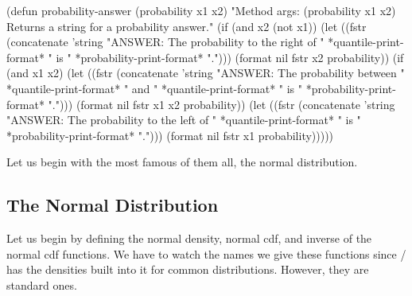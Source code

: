 \nwenddocs{}\plusendmoddef
(defun probability-answer (probability x1 x2)
"Method args: (probability x1 x2)
Returns a string for a probability answer."
  (if (and x2 (not x1))
     (let ((fstr (concatenate 'string
                "ANSWER: The probability to the right of "
                *quantile-print-format* " is "
                *probability-print-format* ".")))
                (format nil fstr x2 probability))
    (if (and x1 x2)
       (let ((fstr (concatenate 'string
                   "ANSWER: The probability between "
                   *quantile-print-format* " and "
                   *quantile-print-format* " is "
                   *probability-print-format* ".")))
             (format nil fstr x1 x2 probability))
     (let ((fstr (concatenate 'string
                   "ANSWER: The probability to the left of "
                   *quantile-print-format* " is "
                  *probability-print-format* ".")))
          (format nil fstr x1 probability)))))
\eatline
{}\nwendcode{}\nwdocspar

Let us begin with the most famous of them all, the normal
distribution.

\subsection{The Normal Distribution}
\label{sec:normal}
Let us begin by defining the normal density, normal cdf, and inverse
of the normal cdf functions. We have to watch the names we give these
functions since \xls/ has the densities built into it for common
distributions.  However, they are standard ones. 

